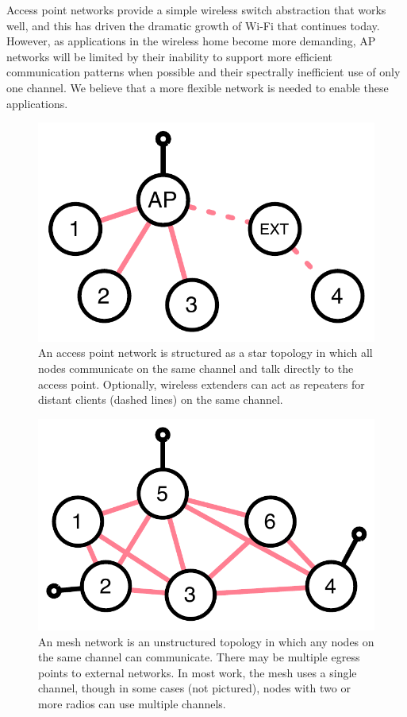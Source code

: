  Access point networks provide a simple wireless switch abstraction that works well, and this has driven the dramatic growth of Wi-Fi that continues today. However, as applications in the wireless home become more demanding, AP networks will be limited by their inability to support more efficient communication patterns when possible and their spectrally inefficient use of only one channel. We believe that a more flexible network is needed to enable these applications.

\begin{figure}[thp]
      \centering
      \includegraphics[width=0.8\columnwidth]{figures/omni/ap.pdf}
      \caption{\label{fig:ap_network} An access point network is structured as a star topology in which all nodes communicate on the same channel and talk directly to the access point. Optionally, wireless extenders can act as repeaters for distant clients (dashed lines) on the same channel.}
\end{figure}
\begin{figure}[thp]
      \centering
      \includegraphics[width=0.8\columnwidth]{figures/omni/mesh.pdf}
      \caption{\label{fig:mesh} An mesh network is an unstructured topology in which any nodes on the same channel can communicate. There may be multiple egress points to external networks. In most work, the mesh uses a single channel, though in some cases (not pictured), nodes with two or more radios can use multiple channels.}
\end{figure}
